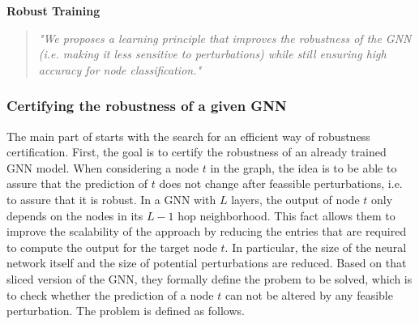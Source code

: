 \documentclass[a4paper,preprint]{sig-alternate}
\begin{document}
\textbf{Robust Training}
\begin{quote}
    \emph{"We proposes a learning principle that improves the robustness of the GNN (i.e. making it less sensitive to perturbations) 
    while still ensuring high accuracy for node classification."} \cite{Zuegner_2019}
\end{quote}

\vfill
\pagebreak

\subsubsection{Certifying the robustness of a given GNN}

The main part of \cite{Zuegner_2019} starts with the search for an efficient way of robustness certification.
First, the goal is to certify the robustness of an already trained GNN model. When considering a node $t$ in the graph, the idea is to be 
able to assure that the prediction of $t$ does not change after feassible perturbations, i.e. to assure that it is robust.
In a GNN with $L$ layers, the output of node $t$ only depends on the nodes in its $L-1$ hop neighborhood. \cite{Zuegner_2019}
This fact allows them to improve the scalability of the approach by reducing the entries that are required to compute the output
for the target node $t$. In particular, the size of the neural network itself and the size of potential perturbations are reduced.
Based on that sliced version of the GNN, they formally define the probem to be solved, which is to check whether the prediction 
of a node $t$ can not be altered by any feasible perturbation. The problem is defined as follows.\newline
\end{document}
